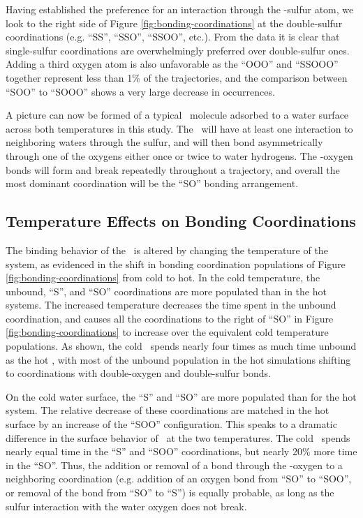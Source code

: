 Having established the preference for an interaction through the \suldiox-sulfur atom, we look to the right side of Figure \ref{fig:bonding-coordinations} at the double-sulfur coordinations (e.g. ``SS'', ``SSO'', ``SSOO'', etc.). From the data it is clear that single-sulfur coordinations are overwhelmingly preferred over double-sulfur ones. Adding a third oxygen atom is also unfavorable as the ``OOO'' and ``SSOOO'' together represent less than 1\% of the trajectories, and the comparison between ``SOO'' to ``SOOO'' shows a very large decrease in occurrences.

A picture can now be formed of a typical \suldiox~molecule adsorbed to a water surface across both temperatures in this study. The \suldiox~will have at least one interaction to neighboring waters through the sulfur, and will then bond asymmetrically through one of the oxygens either once or twice to water hydrogens. The \suldiox-oxygen bonds will form and break repeatedly throughout a trajectory, and overall the most dominant coordination will be the ``SO'' bonding arrangement.


\subsection {Temperature Effects on Bonding Coordinations}

The binding behavior of the \suldiox~is altered by changing the temperature of the system, as evidenced in the shift in bonding coordination populations of Figure \ref{fig:bonding-coordinations} from cold to hot. In the cold temperature, the unbound, ``S'', and ``SO'' coordinations are more populated than in the hot systems. The increased temperature decreases the time spent in the unbound coordination, and causes all the coordinations to the right of ``SO'' in Figure \ref{fig:bonding-coordinations} to increase over the equivalent cold temperature populations. As shown, the cold \suldiox~spends nearly four times as much time unbound as the hot \suldiox, with most of the unbound population in the hot simulations shifting to coordinations with double-oxygen and double-sulfur bonds. 

On the cold water surface, the ``S'' and ``SO'' are more populated than for the hot system. The relative decrease of these coordinations are matched in the hot surface by an increase of the ``SOO'' configuration. This speaks to a dramatic difference in the surface behavior of \suldiox~at the two temperatures. The cold \suldiox~spends nearly equal time in the ``S'' and ``SOO'' coordinations, but nearly 20\% more time in the ``SO''. Thus, the addition or removal of a bond through the \suldiox-oxygen to a neighboring coordination (e.g. addition of an oxygen bond from ``SO'' to ``SOO'', or removal of the bond from ``SO'' to ``S'') is equally probable, as long as the sulfur interaction with the water oxygen does not break. 

